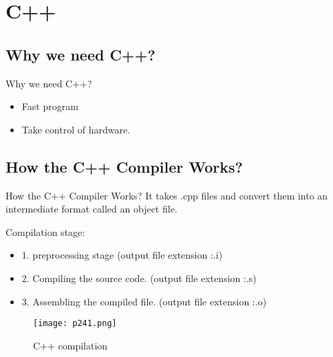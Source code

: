 \newpage
\section{C++}


\subsection{Why we need C++?}

\begin{question}{Why we need C++?}
	\begin{itemize}
		\item Fast program
		\item Take control of hardware.
	\end{itemize}
\end{question}


\subsection{How the C++ Compiler Works?}
\begin{question}{How the C++ Compiler Works?}
	It takes .cpp files and convert them into an intermediate format
	called an object file.

	Compilation stage:
	\begin{itemize}
		\item     1. preprocessing stage (output file extension :.i)
		\item     2. Compiling the source code. (output file extension :.s)
		\item     3. Assembling the compiled file. (output file extension :.o)
	\end{itemize}


	\begin{figure}[H]
		\centering
		\texttt{[image: p241.png]}
		\caption{C++ compilation}
		\label{fig:p241}
	\end{figure}

\end{question}











